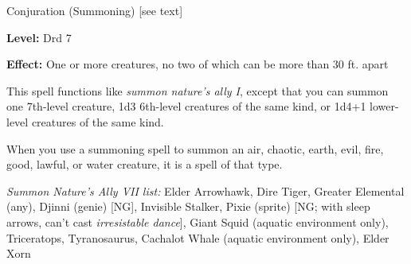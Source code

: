
Conjuration (Summoning) [see text]

\textbf{Level:} Drd 7

\textbf{Effect:} One or more creatures, no two of which can be more than 30 ft. 
apart

This spell functions like \textit{summon nature's ally I}, except that you can 
summon one 7th-level creature, 1d3 6th-level creatures of the same kind, or 1d4+1 
lower-level creatures of the same kind.

When you use a summoning spell to summon an air, chaotic, earth, evil, fire, good, 
lawful, or water creature, it is a spell of that type.

\textit{Summon Nature's Ally VII list:} Elder Arrowhawk, Dire Tiger, Greater Elemental (any), Djinni (genie) [NG], Invisible Stalker, Pixie (sprite) [NG; with sleep arrows, can't cast \textit{irresistable dance}], Giant Squid (aquatic environment only), Triceratops, Tyranosaurus, Cachalot Whale (aquatic environment only), Elder Xorn
